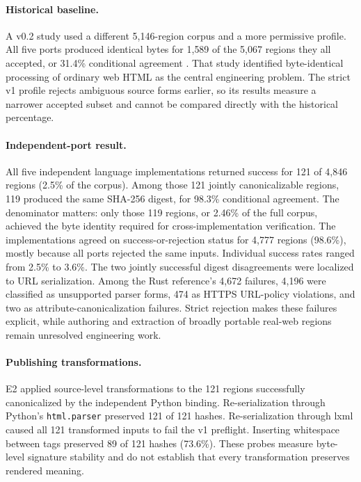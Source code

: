 \documentclass{article}
\begin{document}
\paragraph{Historical baseline.} A v0.2 study used a different 5{,}146-region corpus and a more permissive profile. All five ports produced identical bytes for 1{,}589 of the 5{,}067 regions they all accepted, or 31.4\% conditional agreement \cite{HTMLTrustStudy1Historical}. That study identified byte-identical processing of ordinary web HTML as the central engineering problem. The strict v1 profile rejects ambiguous source forms earlier, so its results measure a narrower accepted subset and cannot be compared directly with the historical percentage.

\paragraph{Independent-port result.} All five independent language implementations returned success for 121 of 4{,}846 regions (2.5\% of the corpus). Among those 121 jointly canonicalizable regions, 119 produced the same SHA-256 digest, for 98.3\% conditional agreement. The denominator matters: only those 119 regions, or 2.46\% of the full corpus, achieved the byte identity required for cross-implementation verification. The implementations agreed on success-or-rejection status for 4{,}777 regions (98.6\%), mostly because all ports rejected the same inputs. Individual success rates ranged from 2.5\% to 3.6\%. The two jointly successful digest disagreements were localized to URL serialization. Among the Rust reference's 4{,}672 failures, 4{,}196 were classified as unsupported parser forms, 474 as HTTPS URL-policy violations, and two as attribute-canonicalization failures. Strict rejection makes these failures explicit, while authoring and extraction of broadly portable real-web regions remain unresolved engineering work.

\paragraph{Publishing transformations.} E2 applied source-level transformations to the 121 regions successfully canonicalized by the independent Python binding. Re-serialization through Python's \texttt{html.parser} preserved 121 of 121 hashes. Re-serialization through lxml caused all 121 transformed inputs to fail the v1 preflight. Inserting whitespace between tags preserved 89 of 121 hashes (73.6\%). These probes measure byte-level signature stability and do not establish that every transformation preserves rendered meaning.
\end{document}
